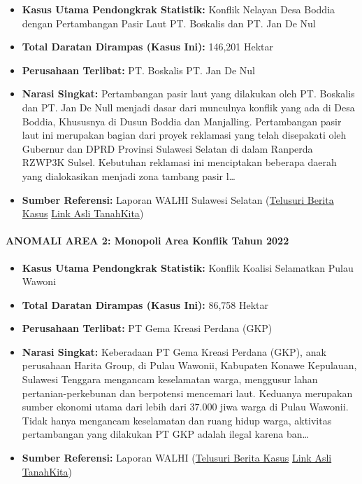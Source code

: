 \documentclass[
]{article}
\providecommand{\tightlist}{%
  \setlength{\itemsep}{0pt}\setlength{\parskip}{0pt}}
\begin{document}
\begin{itemize}
\tightlist
\item
  \textbf{Kasus Utama Pendongkrak Statistik:} Konflik Nelayan Desa
  Boddia dengan Pertambangan Pasir Laut PT. Boskalis dan PT. Jan De Nul
\item
  \textbf{Total Daratan Dirampas (Kasus Ini):} 146,201 Hektar
\item
  \textbf{Perusahaan Terlibat:} PT. Boskalis \textbar{} PT. Jan De Nul
\item
  \textbf{Narasi Singkat:} Pertambangan pasir laut yang dilakukan oleh
  PT. Boskalis dan PT. Jan De Null menjadi dasar dari munculnya konflik
  yang ada di Desa Boddia, Khususnya di Dusun Boddia dan Manjalling.
  Pertambangan pasir laut ini merupakan bagian dari proyek reklamasi
  yang telah disepakati oleh Gubernur dan DPRD Provinsi Sulawesi Selatan
  di dalam Ranperda RZWP3K Sulsel. Kebutuhan reklamasi ini menciptakan
  beberapa daerah yang dialokasikan menjadi zona tambang pasir l\ldots{}
\item
  \textbf{Sumber Referensi:} Laporan WALHI Sulawesi Selatan
  (\href{https://www.google.com/search?q=Konflik\%20Nelayan\%20Desa\%20Boddia\%20dengan\%20Pertambangan\%20Pasir\%20Laut\%20PT.\%20Boskalis\%20dan\%20PT.\%20Jan\%20De\%20Nul\%20PT.\%20Boskalis\%20\%7C\%20PT.\%20Jan\%20De\%20Nul}{Telusuri
  Berita Kasus} \textbar{}
  \href{https://tanahkita.id/data/konflik/detil/dXpRbGVnRTJHS2c}{Link
  Asli TanahKita})
\end{itemize}

\paragraph{ANOMALI AREA 2: Monopoli Area Konflik Tahun
2022}\label{anomali-area-2-monopoli-area-konflik-tahun-2022}

\begin{itemize}
\tightlist
\item
  \textbf{Kasus Utama Pendongkrak Statistik:} Konflik Koalisi Selamatkan
  Pulau Wawoni
\item
  \textbf{Total Daratan Dirampas (Kasus Ini):} 86,758 Hektar
\item
  \textbf{Perusahaan Terlibat:} PT Gema Kreasi Perdana (GKP)
\item
  \textbf{Narasi Singkat:} Keberadaan PT Gema Kreasi Perdana (GKP), anak
  perusahaan Harita Group, di Pulau Wawonii, Kabupaten Konawe Kepulauan,
  Sulawesi Tenggara mengancam keselamatan warga, menggusur lahan
  pertanian-perkebunan dan berpotensi mencemari laut. Keduanya merupakan
  sumber ekonomi utama dari lebih dari 37.000 jiwa warga di Pulau
  Wawonii. Tidak hanya mengancam keselamatan dan ruang hidup warga,
  aktivitas pertambangan yang dilakukan PT GKP adalah ilegal karena
  ban\ldots{}
\item
  \textbf{Sumber Referensi:} Laporan WALHI
  (\href{https://www.google.com/search?q=Konflik\%20Koalisi\%20Selamatkan\%20Pulau\%20Wawoni\%20PT\%20Gema\%20Kreasi\%20Perdana\%20\%28GKP\%29}{Telusuri
  Berita Kasus} \textbar{}
  \href{https://tanahkita.id/data/konflik/detil/SWpxcGxoUThtUVk}{Link
  Asli TanahKita})
\end{itemize}
\end{document}
